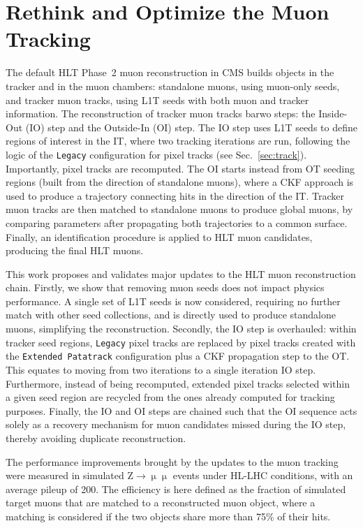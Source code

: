\documentclass{webofc}
\begin{document}
\section{Rethink and Optimize the Muon Tracking}
\label{sec:muon}
%
The default HLT Phase~2 muon reconstruction in CMS builds objects in the tracker and in the muon chambers: standalone muons, using muon-only seeds, and tracker muon tracks, using L1T seeds with both muon and tracker information.
The reconstruction of tracker muon tracks barwo steps: the Inside-Out (IO) step and the Outside-In (OI) step.
The IO step uses L1T seeds to define regions of interest in the IT, where two tracking iterations are run, following the logic of the \texttt{Legacy} configuration for pixel tracks (see Sec.~\ref{sec:track}).
Importantly, pixel tracks are recomputed.
The OI starts instead from OT seeding regions (built from the direction of standalone muons), where a CKF approach is used to produce a trajectory connecting hits in the direction of the IT.
Tracker muon tracks are then matched to standalone muons to produce global muons, by comparing parameters after propagating both trajectories to a common surface.
Finally, an identification procedure is applied to HLT muon candidates, producing the final HLT muons. \par
%
This work proposes and validates major updates to the HLT muon reconstruction chain.
Firstly, we show that removing muon seeds does not impact physics performance.
A single set of L1T seeds is now considered, requiring no further match with other seed collections, and is directly used to produce standalone muons, simplifying the reconstruction.
Secondly, the IO step is overhauled: within tracker seed regions, \texttt{Legacy} pixel tracks are replaced by pixel tracks created with the \texttt{Extended Patatrack} configuration plus a CKF propagation step to the OT.
This equates to moving from two iterations to a single iteration IO step.
Furthermore, instead of being recomputed, extended pixel tracks selected within a given seed region are recycled from the ones already computed for tracking purposes.
Finally, the IO and OI steps are chained such that the OI sequence acts solely as a recovery mechanism for muon candidates missed during the IO step, thereby avoiding duplicate reconstruction. \par
%
The performance improvements brought by the updates to the muon tracking were measured in simulated $\text{Z}\rightarrow\upmu\upmu$ events under HL-LHC conditions, with an average pileup of 200.
The efficiency is here defined as the fraction of simulated target muons that are matched to a reconstructed muon object, where a matching is considered if the two objects share more than 75\% of their hits.
\end{document}

